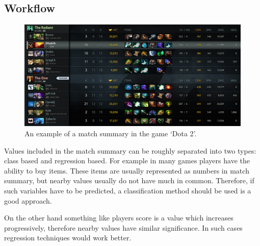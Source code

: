 \documentclass[12pt,a4paper]{book}
\begin{document}
\subsection{Workflow}
\begin{figure}[ht]
\centering
\includegraphics[scale=0.39]{results-summary}
\caption{An example of a match summary in the game `Dota 2'.}
\label{fig:results-summary}
\end{figure}
Values included in the match summary can be roughly separated into two types: class based and regression based.
For example in many games players have the ability to buy items.
These items are usually represented as numbers in match summary, but nearby values usually do not have much in common.
Therefore, if such variables have to be predicted, a classification method should be used is a good approach.

On the other hand something like players score is a value which increases progressively, therefore nearby values have similar significance.
In such cases regression techniques would work better.
\end{document}
